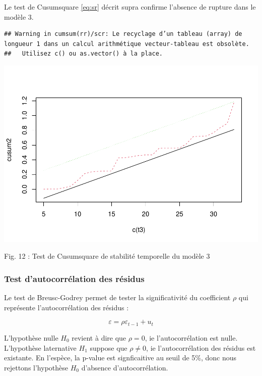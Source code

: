 \documentclass[
]{article}
\begin{document}
Le test de Cusumsquare \ref{eq:sr} décrit supra confirme l'absence de
rupture dans le modèle 3.

\begin{verbatim}
## Warning in cumsum(rr)/scr: Le recyclage d’un tableau (array) de longueur 1 dans un calcul arithmétique vecteur-tableau est obsolète.
##   Utilisez c() ou as.vector() à la place.
\end{verbatim}

\includegraphics{Projet_econometrie_II_files/figure-latex/unnamed-chunk-14-1.pdf}

Fig. 12 : Test de Cusumsquare de stabilité temporelle du modèle 3

\hypertarget{test-dautocorruxe9lation-des-ruxe9sidus}{%
\subsubsection{Test d'autocorrélation des
résidus}\label{test-dautocorruxe9lation-des-ruxe9sidus}}

Le test de Breusc-Godrey permet de tester la significativité du
coefficient \(\rho\) qui représente l'autocorrélation des résidus :

\begin{equation}
    \label{eq:BG}
\varepsilon = \rho \varepsilon_{t-1} + u_t
\end{equation}

L'hypothèse nulle \(H_0\) revient à dire que \(\rho=0\), ie
l'autocorrélation est nulle. L'hypothèse laternative \(H_1\) suppose que
\(\rho \ne 0\), ie l'autocorrélation des résidus est existante. En
l'espèce, la p-value est signficaitive au seuil de 5\%, donc nous
rejettons l'hypothèse \(H_0\) d'absence d'autocorrélation.
\end{document}
